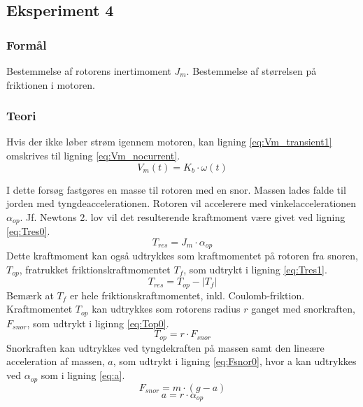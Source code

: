 \subsection{Eksperiment 4}
\subsubsection{Formål}
Bestemmelse af rotorens inertimoment \(J_m\).
Bestemmelse af størrelsen på friktionen i motoren.
\subsubsection{Teori}
Hvis der ikke løber strøm igennem motoren,
kan ligning \ref{eq:Vm_transient1} omskrives til ligning \ref{eq:Vm_nocurrent}.
\begin{equation}
	V_m\left(t\right)=K_b\cdot\omega\left(t\right)
	\label{eq:Vm_nocurrent}
 \end{equation}

I dette forsøg fastgøres en masse til rotoren med en snor.
Massen lades falde til jorden med tyngdeaccelerationen.
Rotoren vil accelerere med vinkelaccelerationen \(\alpha_{op}\).
Jf. Newtons 2. lov vil det resulterende kraftmoment være givet ved ligning \ref{eq:Tres0}.
\begin{equation}
	T_{res}=J_m\cdot\alpha_{op}
	\label{eq:Tres0}
 \end{equation}
Dette kraftmoment kan også udtrykkes som kraftmomentet på rotoren fra snoren, \(T_{op}\),
fratrukket friktionskraftmomentet \(T_f\), som udtrykt i ligning \ref{eq:Tres1}.
\begin{equation}
	T_{res}=T_{op}-\left|T_f\right|
	\label{eq:Tres1}
 \end{equation}
Bemærk at \(T_f\) er hele friktionskraftmomentet, inkl. Coulomb-friktion.
Kraftmomentet \(T_{op}\) kan udtrykkes som rotorens radius \(r\) ganget med snorkraften, \(F_{snor}\),
som udtrykt i liginng \ref{eq:Top0}.
\begin{equation}
	T_{op}=r\cdot{F_{snor}}
	\label{eq:Top0}
 \end{equation}
Snorkraften kan udtrykkes ved tyngdekraften på massen samt den lineære acceleration af massen, \(a\),
som udtrykt i ligning \ref{eq:Fsnor0}, hvor a kan udtrykkes ved \(\alpha_{op}\) som i ligning \ref{eq:a}.
\begin{equation}
	F_{snor}=m\cdot(g-a)
	\label{eq:Fsnor0}
 \end{equation}
\begin{equation}
	a=r\cdot\alpha_{op}
	\label{eq:a}
 \end{equation}

